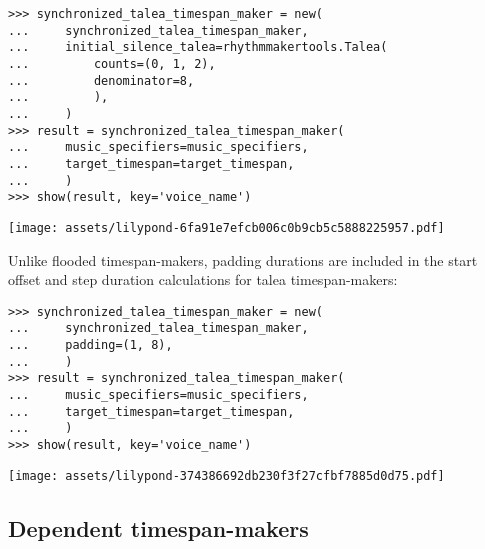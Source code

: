 \begin{abjadbookoutput}
\begin{singlespacing}
\vspace{-0.5\baselineskip}
\begin{verbatim}
>>> synchronized_talea_timespan_maker = new(
...     synchronized_talea_timespan_maker,
...     initial_silence_talea=rhythmmakertools.Talea(
...         counts=(0, 1, 2),
...         denominator=8,
...         ),
...     )
>>> result = synchronized_talea_timespan_maker(
...     music_specifiers=music_specifiers,
...     target_timespan=target_timespan,
...     )
>>> show(result, key='voice_name')
\end{verbatim}
\noindent\texttt{[image: assets/lilypond-6fa91e7efcb006c0b9cb5c5888225957.pdf]}
\end{singlespacing}
\end{abjadbookoutput}


\noindent Unlike flooded timespan-makers, padding durations are included in the
start offset and step duration calculations for talea timespan-makers:

\begin{comment}
<abjad>
synchronized_talea_timespan_maker = new(
    synchronized_talea_timespan_maker,
    padding=(1, 8),
    )
result = synchronized_talea_timespan_maker(
    music_specifiers=music_specifiers,
    target_timespan=target_timespan,
    )
show(result, key='voice_name')
</abjad>
\end{comment}

\begin{abjadbookoutput}
\begin{singlespacing}
\vspace{-0.5\baselineskip}
\begin{verbatim}
>>> synchronized_talea_timespan_maker = new(
...     synchronized_talea_timespan_maker,
...     padding=(1, 8),
...     )
>>> result = synchronized_talea_timespan_maker(
...     music_specifiers=music_specifiers,
...     target_timespan=target_timespan,
...     )
>>> show(result, key='voice_name')
\end{verbatim}
\noindent\texttt{[image: assets/lilypond-374386692db230f3f27cfbf7885d0d75.pdf]}
\end{singlespacing}
\end{abjadbookoutput}

\subsection{Dependent timespan-makers} %
\label{ssec:dependent-timespan-makers}

